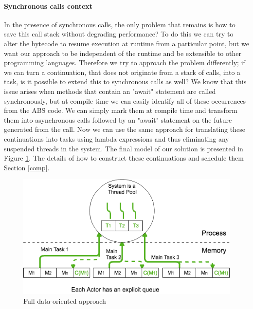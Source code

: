 
\paragraph{Synchronous calls context}

In the presence of synchronous calls, the only problem that remains is how to save this call stack without degrading performance? To do this we can try to alter the bytecode to resume execution at runtime from a particular point, but we want our approach to be independent of the runtime and be extensible to other programming languages. Therefore we try to approach the problem differently; if we can turn a continuation, that does not originate from a stack of calls, into a task, is it possible to extend this to synchronous calls as well? We know that this issue arises when methods that contain an "await" statement are called synchronously, but at compile time we can easily identify all of these occurrences from the ABS code. We can simply mark them at compile time and transform them into asynchronous calls followed by an "await" statement on the future generated from the call. Now we can use the same approach for translating these continuations into tasks using lambda expressions and thus eliminating any suspended threads in the system. The final model of our solution is presented in Figure \ref{sol}. The details of how to construct these continuations and schedule them Section \ref{comp}. 

\begin{figure}
	\centering
	\includegraphics[scale=0.5]{solution.png}
	\caption{Full data-oriented approach}
	\label{sol}
\end{figure}


